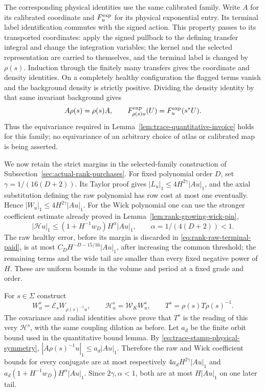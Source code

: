 The corresponding physical identities use the same calibrated family.
Write $A$ for its calibrated coordinate and $F_u^{\rm exp}$ for its
physical exponential entry. Its terminal label identification commutes
with the signed action. This property passes to its transported
coordinates: apply the signed pullback to the defining transfer
integral and change the integration variables; the kernel and the
selected representation are carried to themselves, and the terminal
label is changed by $\rho(s)$. Induction through the finitely many
transfers gives the coordinate and density identities. On a completely
healthy configuration the flagged terms vanish and the background
density is strictly positive. Dividing the density identity by that
same invariant background gives
\begin{equation}\label{eq:trace-stamp-physical-symmetry}
 A\rho(s)=\rho(s)A,\qquad
 F_{\rho(s)u}^{\rm exp}(U)=F_u^{\rm exp}(s^*U).
\end{equation}
Thus the equivariance required in
Lemma~\ref{lem:trace-quantitative-invoice} holds for this family; no
equivariance of an arbitrary choice of atlas or calibrated map is being
asserted.

We now retain the strict margins in the selected-family construction
of Subsection~\ref{sec:actual-rank-purchases}. For fixed polynomial order
$D$, set $\gamma=1/(16(D+2))$. Its Taylor proof gives
$|L_u|_1\le4H^{2\gamma}|Au|_1$, and the axial substitution defining
the raw polynomial has row cost at most one eventually. Hence
$|W_u|_1\le4H^{2\gamma}|Au|_1$. For the Wick polynomial one can
use the stronger coefficient estimate already proved in
Lemma~\ref{lem:rank-growing-wick-pin},
\[
 |\mathcal H u|_1\le(1+H^{-1}w_D)H^\alpha|Au|_1,
 \qquad \alpha=1/(4(D+2))<1.
\]
The raw healthy error, before its margin is discarded in
\eqref{eq:rank-raw-terminal-paid}, is at most
$C_DH^{-D-15/16}|Au|_1$, after increasing the common threshold;
the remaining terms and the wide tail are smaller than every fixed
negative power of $H$. These are uniform bounds in the volume and
period at a fixed grade and order.

For $s\in\Sigma$ construct
\[
 W^{s}_u=\mathcal E_sW_{\rho(s)^{-1}u},\qquad
 \mathcal H^{s}_u=\mathcal W_K W^{s}_u,
 \qquad T^{s}=\rho(s)T\rho(s)^{-1}.
\]
The covariance and radial identities above prove that $T^s$ is the
reading of this very $\mathcal H^s$, with the same coupling dilation
as before. Let $a_d$ be the finite orbit bound used in the quantitative bound
lemma. By \eqref{eq:trace-stamp-physical-symmetry},
$|A\rho(s)^{-1}u|_1\le a_d|Au|_1$. Therefore the raw and Wick
coefficient bounds for every conjugate are at most respectively
$4a_dH^{2\gamma}|Au|_1$ and
$a_d(1+H^{-1}w_D)H^\alpha|Au|_1$. Since $2\gamma,\alpha<1$,
both are at most $H|Au|_1$ on one later tail.

